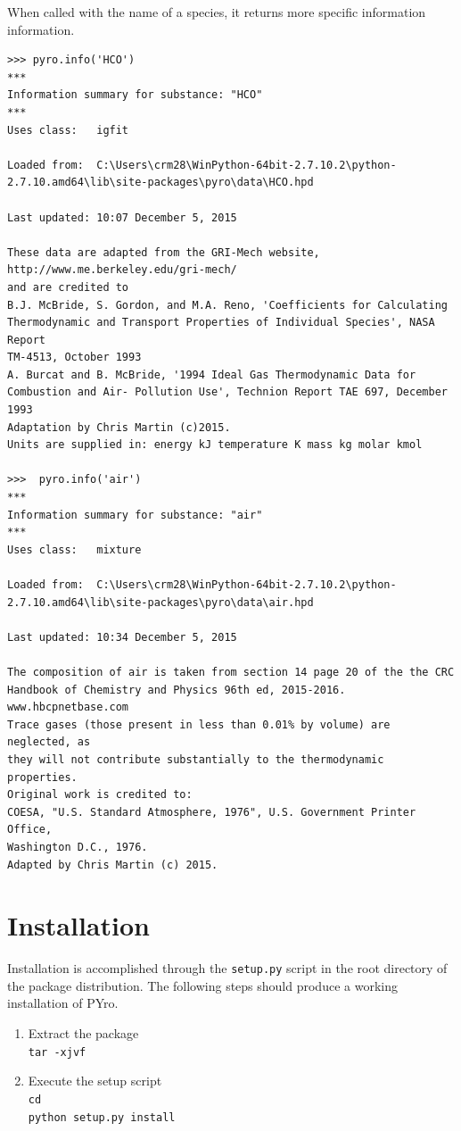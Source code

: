 When called with the name of a species, it returns more specific information information. 
\begin{verbatim}
>>> pyro.info('HCO')
***
Information summary for substance: "HCO"
***
Uses class:   igfit

Loaded from:  C:\Users\crm28\WinPython-64bit-2.7.10.2\python-2.7.10.amd64\lib\site-packages\pyro\data\HCO.hpd

Last updated: 10:07 December 5, 2015

These data are adapted from the GRI-Mech website,
http://www.me.berkeley.edu/gri-mech/
and are credited to
B.J. McBride, S. Gordon, and M.A. Reno, 'Coefficients for Calculating
Thermodynamic and Transport Properties of Individual Species', NASA Report
TM-4513, October 1993
A. Burcat and B. McBride, '1994 Ideal Gas Thermodynamic Data for
Combustion and Air- Pollution Use', Technion Report TAE 697, December 1993
Adaptation by Chris Martin (c)2015.
Units are supplied in: energy kJ temperature K mass kg molar kmol

>>>  pyro.info('air')
***
Information summary for substance: "air"
***
Uses class:   mixture

Loaded from:  C:\Users\crm28\WinPython-64bit-2.7.10.2\python-2.7.10.amd64\lib\site-packages\pyro\data\air.hpd

Last updated: 10:34 December 5, 2015

The composition of air is taken from section 14 page 20 of the the CRC
Handbook of Chemistry and Physics 96th ed, 2015-2016.
www.hbcpnetbase.com
Trace gases (those present in less than 0.01% by volume) are neglected, as
they will not contribute substantially to the thermodynamic properties.
Original work is credited to:
COESA, "U.S. Standard Atmosphere, 1976", U.S. Government Printer Office,
Washington D.C., 1976.
Adapted by Chris Martin (c) 2015.
\end{verbatim}


\section{Installation}
Installation is accomplished through the \verb|setup.py| script in the root directory of the package distribution.  The following steps should produce a working installation of PYro.
\begin{enumerate}
\item Extract the package\\
\texttt{tar -xjvf \lpackage}
\item Execute the setup script\\
\texttt{cd \package}\\
\texttt{python setup.py install}\\
\end{enumerate}

